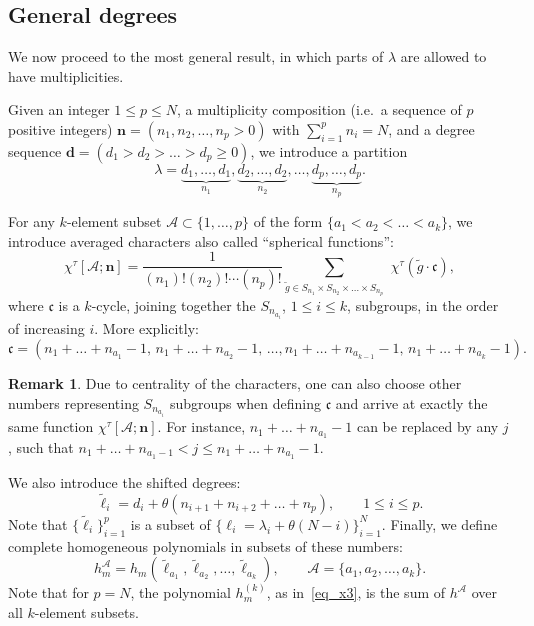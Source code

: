 \documentclass[11pt]{article}
\theoremstyle{definition}
\newtheorem{rema}[theo]{Remark}
\numberwithin{equation}{section}
\begin{document}
\subsection{General degrees}

We now proceed to the most general result, in which parts of $\lambda$ are allowed to have multiplicities.

Given an integer $1\le p\le N$, a multiplicity composition (i.e.\ a sequence of $p$ positive integers) $\mathbf n=(n_1, n_2, \dots, n_p>0)$ with $\sum_{i=1}^p n_i=N$, and a degree sequence $\mathbf d=(d_1> d_2> \dots> d_p\ge 0)$, we introduce a partition
\begin{equation}
\label{eq_general_lambda}
\lambda= \underbrace{d_1,\dots, d_{1}}_{n_1}, \underbrace{d_2,\dots, d_{2}}_{n_2}, \dots, \underbrace{d_p,\dots, d_{p}}_{n_p}.
\end{equation}

For any $k$-element subset $\mathcal A\subset \{1,\dots,p\}$ of the form $\{a_1<a_2<\dots<a_k\}$, we introduce averaged characters also called ``spherical functions'':
\begin{equation}
\label{eq_family_character}
 \chi^\tau[\mathcal A; \mathbf n]=\frac{1}{(n_1)!(n_2)!\cdots (n_p)!}\sum_{\tilde g\in S_{n_1}\times S_{n_2}\times  \dots \times S_{n_p}}\,\, \chi^\tau(\tilde g \cdot \mathfrak c),
\end{equation}
where $\mathfrak c$ is a $k$-cycle, joining together the $S_{n_{a_i}}$, $1\le i\le k$, subgroups, in the order of increasing $i$. More explicitly:
$$
 \mathfrak c= (n_1+\dots+n_{a_1}-1,\, n_1+\dots+n_{a_2}-1,\, \dots, n_1+\dots+n_{a_{k-1}}-1,\, n_1+\dots+n_{a_{k}}-1).
$$
\begin{rema}
Due to centrality of the characters, one can also choose other numbers representing $S_{n_{a_i}}$ subgroups when defining $\mathfrak c$ and arrive at exactly the same function $\chi^{\tau}[\mathcal A; \mathbf n]$. For instance, $n_1+\dots+n_{a_1}-1$ can be replaced by any $j$, such that $n_1+\dots+ n_{a_1-1}<j \le  n_1+\dots+n_{a_1}-1$.
\end{rema}

We also introduce the shifted degrees:
$$
 \tilde \ell_i= d_i + \theta (n_{i+1}+n_{i+2}+\dots+n_p),\qquad 1\le i \le p.
$$
Note that $\{\tilde \ell_i\}_{i=1}^p$ is a subset of $\{\ell_i=\lambda_{i}+\theta(N-i)\}_{i=1}^N$. Finally, we define complete homogeneous polynomials in subsets of these numbers:
\begin{equation}
\label{eq_general_h}
 h^{\mathcal A}_{m}=h_m(\tilde \ell_{a_1},\tilde \ell_{a_2},\dots,\tilde \ell_{a_k}), \qquad \mathcal A=\{a_1,a_2,\dots,a_k\}.
\end{equation}
Note that for $p=N$, the polynomial $h^{(k)}_m$, as in~\eqref{eq_x3}, is the sum of $h^{\mathcal A}$ over all $k$-element subsets.
\end{document}

